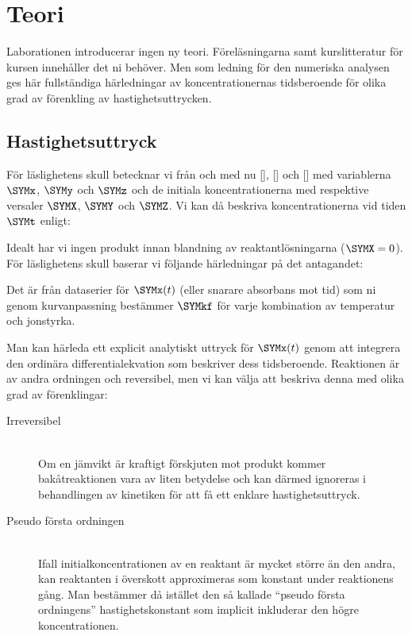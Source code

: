 \section{Teori}
\label{sec:teori}
Laborationen introducerar ingen ny teori. Föreläsningarna samt
kurslitteratur för kursen innehåller det ni behöver. Men som ledning för
den numeriska analysen ges här fullständiga härledningar av
koncentrationernas tidsberoende för olika grad av förenkling av
hastighetsuttrycken.

\subsection{Hastighetsuttryck}
För läslighetens skull betecknar vi från och med nu [],
[] och [] med variablerna $\SYMx$, $\SYMy$ och $\SYMz$ och de
initiala koncentrationerna med respektive versaler $\SYMX$, $\SYMY$ och $\SYMZ$. Vi
kan då beskriva koncentrationerna vid tiden $\SYMt$ enligt:



Idealt har vi ingen produkt innan blandning av reaktantlösningarna
($\SYMX=0$). För läslighetens skull baserar vi följande härledningar på det
antagandet:



Det är från dataserier för $\SYMx(t)$ (eller snarare absorbans mot tid) som
ni genom kurvanpassning bestämmer $\SYMkf$ för varje kombination av
temperatur och jonstyrka.

Man kan härleda ett explicit analytiskt uttryck för $\SYMx(t)$ genom att
integrera den ordinära differentialekvation som beskriver dess
tidsberoende. Reaktionen är av andra ordningen och reversibel, men vi kan
välja att beskriva denna med olika grad av förenklingar:
\begin{description}
\item[Irreversibel] \hfill \\
  Om en jämvikt är kraftigt förskjuten mot produkt kommer
  bakåtreaktionen vara av liten betydelse och kan därmed
  ignoreras i behandlingen av kinetiken för att få
  ett enklare hastighetsuttryck.
\item[Pseudo första ordningen] \hfill \\ %
  Ifall initialkoncentrationen av en reaktant är mycket större än den andra,
  kan reaktanten i överskott approximeras som konstant under reaktionens
  gång. Man bestämmer då istället den så kallade ``pseudo första ordningens''
  hastighetskonstant som implicit inkluderar den högre koncentrationen.
\end{description}

